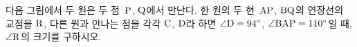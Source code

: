 다음 그림에서 두 원은 두 점~$\mathrm{P}$, $\mathrm{Q}$에서 만난다. 한 원의 두 현~$\mathrm{AP}$, $\mathrm{BQ}$의 연장선의 교점을 $\mathrm{R}$, 다른 원과 만나는 점을 각각 $\mathrm{C}$, $\mathrm{D}$라 하면 $\angle\mathrm{D}=94^\circ$, $\angle\mathrm{BAP}=110^\circ$일 때, $\angle\mathrm{R}$의 크기를 구하시오.
\par\smallskip\begin{center}\resizebox{\ifdim\width>\linewidth\linewidth\else\width\fi}{!}{}\end{center}
